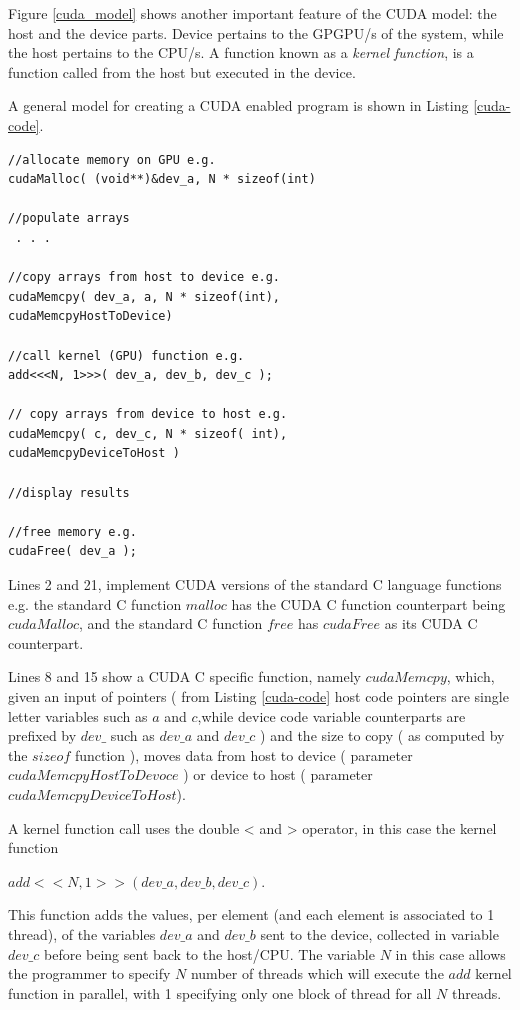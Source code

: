 \documentclass{acm_proc_article-sp}
\begin{document}
Figure \ref{cuda_model} shows another important feature of the CUDA model:
the host and the device parts. Device
pertains to the GPGPU/s of the system, while the host
pertains to the CPU/s. A function known as a \textit{kernel
function}, is a function called from the host but executed in
the device.

A general model for creating a CUDA enabled program is
shown in Listing \ref{cuda-code}.


\lstset{numbers=left, numberstyle=\tiny, stepnumber=1, numbersep=5pt, label=cuda_gencode}

\begin{lstlisting}[label=cuda-code,caption=General code flow for CUDA programming]
//allocate memory on GPU e.g.
cudaMalloc( (void**)&dev_a, N * sizeof(int)

//populate arrays
 . . .

//copy arrays from host to device e.g.
cudaMemcpy( dev_a, a, N * sizeof(int), 
cudaMemcpyHostToDevice)

//call kernel (GPU) function e.g.
add<<<N, 1>>>( dev_a, dev_b, dev_c );

// copy arrays from device to host e.g.
cudaMemcpy( c, dev_c, N * sizeof( int), 
cudaMemcpyDeviceToHost )

//display results

//free memory e.g.
cudaFree( dev_a );
\end{lstlisting}

Lines 2 and 21, implement CUDA versions of
the standard C language functions e.g. the standard C
function $malloc$ has the CUDA C function counterpart being
$cudaMalloc$, and the standard C function $free$ has $cudaFree$ as its CUDA C counterpart.

Lines 8 and 15 show a CUDA C specific function, namely
$cudaMemcpy$, which, given an input of pointers ( from Listing \ref{cuda-code} host code
pointers are single letter variables such as $a$ and $c$,while
device code variable counterparts are prefixed by $dev\_$ such
as $dev\_a$ and $dev\_c$ ) and the size to copy ( as computed by
the $sizeof$ function ), moves data from host to device
( parameter $cudaMemcpyHostToDevoce$ ) or device to host
( parameter $cudaMemcpyDeviceToHost$).

A kernel function call uses the double < and > operator, in
this case the kernel function 

$add< < N, 1 > >( dev\_a, dev\_b,
dev\_c )$.

This function adds the values, per element (and
each element is associated to 1 thread), of the variables
$dev\_a$ and $dev\_b$ sent to the device, collected in variable
$dev\_c$ before being sent back to the host/CPU. The variable
$N$ in this case allows the programmer to specify $N$ number of
threads which will execute the $add$ kernel function in parallel, with 1
specifying only one block of thread for all $N$ threads.
\end{document}
